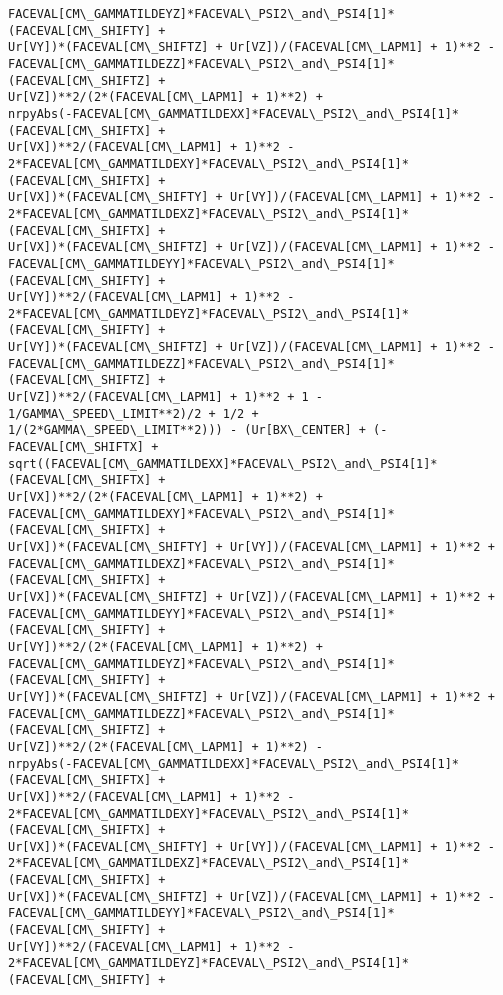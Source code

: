 \documentclass[landscape,letterpaper,10pt,english]{article}
\begin{document}
\begin{Verbatim}[commandchars=\\\{\}]
FACEVAL[CM\_GAMMATILDEYZ]*FACEVAL\_PSI2\_and\_PSI4[1]*(FACEVAL[CM\_SHIFTY] +
Ur[VY])*(FACEVAL[CM\_SHIFTZ] + Ur[VZ])/(FACEVAL[CM\_LAPM1] + 1)**2 -
FACEVAL[CM\_GAMMATILDEZZ]*FACEVAL\_PSI2\_and\_PSI4[1]*(FACEVAL[CM\_SHIFTZ] +
Ur[VZ])**2/(2*(FACEVAL[CM\_LAPM1] + 1)**2) +
nrpyAbs(-FACEVAL[CM\_GAMMATILDEXX]*FACEVAL\_PSI2\_and\_PSI4[1]*(FACEVAL[CM\_SHIFTX] +
Ur[VX])**2/(FACEVAL[CM\_LAPM1] + 1)**2 -
2*FACEVAL[CM\_GAMMATILDEXY]*FACEVAL\_PSI2\_and\_PSI4[1]*(FACEVAL[CM\_SHIFTX] +
Ur[VX])*(FACEVAL[CM\_SHIFTY] + Ur[VY])/(FACEVAL[CM\_LAPM1] + 1)**2 -
2*FACEVAL[CM\_GAMMATILDEXZ]*FACEVAL\_PSI2\_and\_PSI4[1]*(FACEVAL[CM\_SHIFTX] +
Ur[VX])*(FACEVAL[CM\_SHIFTZ] + Ur[VZ])/(FACEVAL[CM\_LAPM1] + 1)**2 -
FACEVAL[CM\_GAMMATILDEYY]*FACEVAL\_PSI2\_and\_PSI4[1]*(FACEVAL[CM\_SHIFTY] +
Ur[VY])**2/(FACEVAL[CM\_LAPM1] + 1)**2 -
2*FACEVAL[CM\_GAMMATILDEYZ]*FACEVAL\_PSI2\_and\_PSI4[1]*(FACEVAL[CM\_SHIFTY] +
Ur[VY])*(FACEVAL[CM\_SHIFTZ] + Ur[VZ])/(FACEVAL[CM\_LAPM1] + 1)**2 -
FACEVAL[CM\_GAMMATILDEZZ]*FACEVAL\_PSI2\_and\_PSI4[1]*(FACEVAL[CM\_SHIFTZ] +
Ur[VZ])**2/(FACEVAL[CM\_LAPM1] + 1)**2 + 1 - 1/GAMMA\_SPEED\_LIMIT**2)/2 + 1/2 +
1/(2*GAMMA\_SPEED\_LIMIT**2))) - (Ur[BX\_CENTER] + (-FACEVAL[CM\_SHIFTX] +
sqrt((FACEVAL[CM\_GAMMATILDEXX]*FACEVAL\_PSI2\_and\_PSI4[1]*(FACEVAL[CM\_SHIFTX] +
Ur[VX])**2/(2*(FACEVAL[CM\_LAPM1] + 1)**2) +
FACEVAL[CM\_GAMMATILDEXY]*FACEVAL\_PSI2\_and\_PSI4[1]*(FACEVAL[CM\_SHIFTX] +
Ur[VX])*(FACEVAL[CM\_SHIFTY] + Ur[VY])/(FACEVAL[CM\_LAPM1] + 1)**2 +
FACEVAL[CM\_GAMMATILDEXZ]*FACEVAL\_PSI2\_and\_PSI4[1]*(FACEVAL[CM\_SHIFTX] +
Ur[VX])*(FACEVAL[CM\_SHIFTZ] + Ur[VZ])/(FACEVAL[CM\_LAPM1] + 1)**2 +
FACEVAL[CM\_GAMMATILDEYY]*FACEVAL\_PSI2\_and\_PSI4[1]*(FACEVAL[CM\_SHIFTY] +
Ur[VY])**2/(2*(FACEVAL[CM\_LAPM1] + 1)**2) +
FACEVAL[CM\_GAMMATILDEYZ]*FACEVAL\_PSI2\_and\_PSI4[1]*(FACEVAL[CM\_SHIFTY] +
Ur[VY])*(FACEVAL[CM\_SHIFTZ] + Ur[VZ])/(FACEVAL[CM\_LAPM1] + 1)**2 +
FACEVAL[CM\_GAMMATILDEZZ]*FACEVAL\_PSI2\_and\_PSI4[1]*(FACEVAL[CM\_SHIFTZ] +
Ur[VZ])**2/(2*(FACEVAL[CM\_LAPM1] + 1)**2) -
nrpyAbs(-FACEVAL[CM\_GAMMATILDEXX]*FACEVAL\_PSI2\_and\_PSI4[1]*(FACEVAL[CM\_SHIFTX] +
Ur[VX])**2/(FACEVAL[CM\_LAPM1] + 1)**2 -
2*FACEVAL[CM\_GAMMATILDEXY]*FACEVAL\_PSI2\_and\_PSI4[1]*(FACEVAL[CM\_SHIFTX] +
Ur[VX])*(FACEVAL[CM\_SHIFTY] + Ur[VY])/(FACEVAL[CM\_LAPM1] + 1)**2 -
2*FACEVAL[CM\_GAMMATILDEXZ]*FACEVAL\_PSI2\_and\_PSI4[1]*(FACEVAL[CM\_SHIFTX] +
Ur[VX])*(FACEVAL[CM\_SHIFTZ] + Ur[VZ])/(FACEVAL[CM\_LAPM1] + 1)**2 -
FACEVAL[CM\_GAMMATILDEYY]*FACEVAL\_PSI2\_and\_PSI4[1]*(FACEVAL[CM\_SHIFTY] +
Ur[VY])**2/(FACEVAL[CM\_LAPM1] + 1)**2 -
2*FACEVAL[CM\_GAMMATILDEYZ]*FACEVAL\_PSI2\_and\_PSI4[1]*(FACEVAL[CM\_SHIFTY] +

\end{Verbatim}
\end{document}

